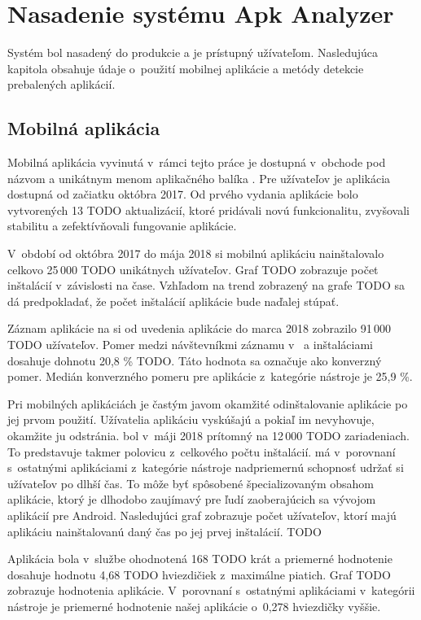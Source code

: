 \chapter{Nasadenie systému Apk Analyzer}
Systém  bol nasadený do produkcie a je prístupný užívateľom. Nasledujúca kapitola obsahuje údaje o~použití mobilnej aplikácie a metódy detekcie prebalených aplikácií.

\section{Mobilná aplikácia}

Mobilná aplikácia vyvinutá v~rámci tejto práce je dostupná v~obchode  pod názvom  a unikátnym menom aplikačného balíka . Pre užívateľov je aplikácia dostupná od začiatku októbra 2017. Od prvého vydania aplikácie bolo vytvorených 13 TODO aktualizácií, ktoré pridávali novú funkcionalitu, zvyšovali stabilitu a zefektívňovali fungovanie aplikácie.

V~období od októbra 2017 do mája 2018 si mobilnú aplikáciu nainštalovalo celkovo 25\,000 TODO unikátnych užívateľov. Graf TODO zobrazuje počet inštalácií v~závislosti na čase. Vzhľadom na trend zobrazený na grafe TODO sa dá predpokladať, že počet inštalácií aplikácie bude naďalej stúpať. 

Záznam aplikácie na  si od uvedenia aplikácie do marca 2018 zobrazilo 91\,000 TODO užívateľov. Pomer medzi návštevníkmi záznamu v~ a inštaláciami dosahuje dohnotu 20,8 \% TODO. Táto hodnota sa označuje ako konverzný pomer. Medián konverzného pomeru pre aplikácie z~kategórie nástroje je 25,9 \%. 

Pri mobilných aplikáciách je častým javom okamžité odinštalovanie aplikácie po jej prvom použití. Užívatelia aplikáciu vyskúšajú a pokiaľ im nevyhovuje, okamžite ju odstránia.  bol v~máji 2018 prítomný na 12\,000 TODO zariadeniach. To predstavuje takmer polovicu z~celkového počtu inštalácií.  má v~porovnaní s~ostatnými aplikáciami z~kategórie nástroje nadpriemernú schopnosť udržať si užívateľov po dlhší čas. To môže byť spôsobené špecializovaným obsahom aplikácie, ktorý je dlhodobo zaujímavý pre ľudí zaoberajúcich sa vývojom aplikácií pre Android. Nasledujúci graf zobrazuje počet užívateľov, ktorí majú aplikáciu nainštalovanú daný čas po jej prvej inštalácií. TODO

Aplikácia bola v~službe  ohodnotená 168 TODO krát a priemerné hodnotenie dosahuje hodnotu 4,68 TODO hviezdičiek z~maximálne piatich. Graf TODO zobrazuje hodnotenia aplikácie. V~porovnaní s~ostatnými aplikáciami v~kategórii nástroje je priemerné hodnotenie našej aplikácie o~0,278 hviezdičky vyššie.


